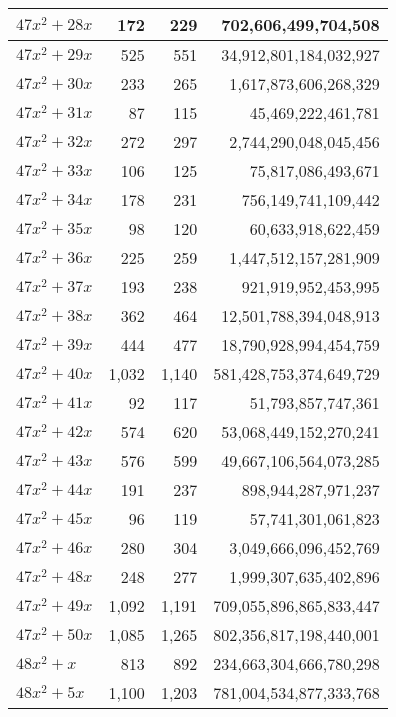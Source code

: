 \documentclass[a4paper]{amsproc}
\theoremstyle{plain}
\begin{document}
\begin{longtable}{ | l | r | r | r | }
$47x^2 + 28x$ & 172 & 229 & 702{,}606{,}499{,}704{,}508 \\ \hline
$47x^2 + 29x$ & 525 & 551 & 34{,}912{,}801{,}184{,}032{,}927 \\ \hline
$47x^2 + 30x$ & 233 & 265 & 1{,}617{,}873{,}606{,}268{,}329 \\ \hline
$47x^2 + 31x$ & 87 & 115 & 45{,}469{,}222{,}461{,}781 \\ \hline
$47x^2 + 32x$ & 272 & 297 & 2{,}744{,}290{,}048{,}045{,}456 \\ \hline
$47x^2 + 33x$ & 106 & 125 & 75{,}817{,}086{,}493{,}671 \\ \hline
$47x^2 + 34x$ & 178 & 231 & 756{,}149{,}741{,}109{,}442 \\ \hline
$47x^2 + 35x$ & 98 & 120 & 60{,}633{,}918{,}622{,}459 \\ \hline
$47x^2 + 36x$ & 225 & 259 & 1{,}447{,}512{,}157{,}281{,}909 \\ \hline
$47x^2 + 37x$ & 193 & 238 & 921{,}919{,}952{,}453{,}995 \\ \hline
$47x^2 + 38x$ & 362 & 464 & 12{,}501{,}788{,}394{,}048{,}913 \\ \hline
$47x^2 + 39x$ & 444 & 477 & 18{,}790{,}928{,}994{,}454{,}759 \\ \hline
$47x^2 + 40x$ & 1{,}032 & 1{,}140 & 581{,}428{,}753{,}374{,}649{,}729 \\ \hline
$47x^2 + 41x$ & 92 & 117 & 51{,}793{,}857{,}747{,}361 \\ \hline
$47x^2 + 42x$ & 574 & 620 & 53{,}068{,}449{,}152{,}270{,}241 \\ \hline
$47x^2 + 43x$ & 576 & 599 & 49{,}667{,}106{,}564{,}073{,}285 \\ \hline
$47x^2 + 44x$ & 191 & 237 & 898{,}944{,}287{,}971{,}237 \\ \hline
$47x^2 + 45x$ & 96 & 119 & 57{,}741{,}301{,}061{,}823 \\ \hline
$47x^2 + 46x$ & 280 & 304 & 3{,}049{,}666{,}096{,}452{,}769 \\ \hline
$47x^2 + 48x$ & 248 & 277 & 1{,}999{,}307{,}635{,}402{,}896 \\ \hline
$47x^2 + 49x$ & 1{,}092 & 1{,}191 & 709{,}055{,}896{,}865{,}833{,}447 \\ \hline
$47x^2 + 50x$ & 1{,}085 & 1{,}265 & 802{,}356{,}817{,}198{,}440{,}001 \\ \hline
$48x^2 + x$ & 813 & 892 & 234{,}663{,}304{,}666{,}780{,}298 \\ \hline
$48x^2 + 5x$ & 1{,}100 & 1{,}203 & 781{,}004{,}534{,}877{,}333{,}768 \\ \hline

\end{longtable}
\end{document}
